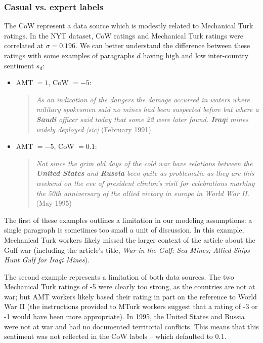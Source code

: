 \subsubsection{Casual vs. expert labels}
The CoW represent a data source which is modestly related to
Mechanical Turk ratings. In the NYT dataset, CoW ratings and
Mechanical Turk ratings were correlated at $\sigma=0.196$.  We can
better understand the difference between these ratings with some
examples of paragraphs $d$ having high and low inter-country sentiment
$s_d$:
\begin{itemize}
  \item AMT $= 1$, CoW $=-5$: \begin{quote} \emph{As an
    indication of the dangers the damage occurred in waters where
    military spokesmen said no mines had been suspected before but
    where a \textbf{Saudi} officer said today that some 22 were later
    found. \textbf{Iraq}i mines widely deployed [sic]} (February 1991)
    \citep{cushman:1991}
\end{quote}
  \item AMT $ = -5$, CoW $=0.1$: \begin{quote}\emph{Not since
    the grim old days of the cold war have relations between the
    \textbf{United States} and \textbf{Russia} been quite as problematic as they
    are this weekend on the eve of president clinton's visit for
    celebrations marking the 50th anniversary of the allied victory in
    europe in World War II.} (May 1995) \citep{apple:1995}
\end{quote}
\end{itemize}

The first of these examples outlines a limitation in our modeling
assumptions: a single paragraph is sometimes too small a unit of
discussion.  In this example, Mechanical Turk workers likely missed
the larger context of the article about the Gulf war (including the
article's title, \emph{War in the Gulf: Sea Mines; Allied Ships Hunt
  Gulf for Iraqi Mines}).

The second example represents a limitation of both data sources.  The
two Mechanical Turk ratings of -5 were clearly too strong, as the
countries are not at war; but AMT workers likely based their rating in
part on the reference to World War II (the instructions provided to
MTurk workers suggest that a rating of -3 or -1 would have been more
appropriate).  In 1995, the United States and Russia were not at war
and had no documented territorial conflicts.  This means that this
sentiment was not reflected in the CoW labels -- which defaulted to
0.1.

